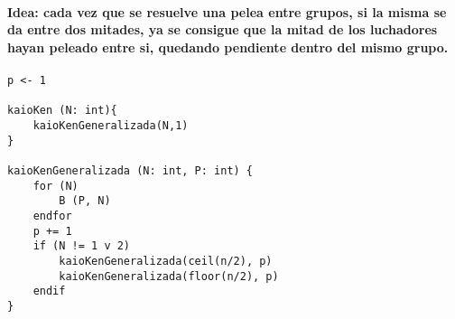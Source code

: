 \documentclass[10pt,a4paper]{article}
\begin{document}
\subtitle{Ejercicio 1}

\paragraph{ Idea: cada vez que se resuelve una pelea entre grupos, si la misma se da entre dos mitades, ya se consigue que la mitad de los luchadores hayan peleado entre si, quedando pendiente dentro del mismo grupo.}

\begin{verbatim}
p <- 1

kaioKen (N: int){
	kaioKenGeneralizada(N,1)
}

kaioKenGeneralizada (N: int, P: int) {
	for (N)
		B (P, N)
	endfor
	p += 1
	if (N != 1 v 2)		
		kaioKenGeneralizada(ceil(n/2), p)
		kaioKenGeneralizada(floor(n/2), p)
	endif	
}
\end{verbatim}
\end{document}

